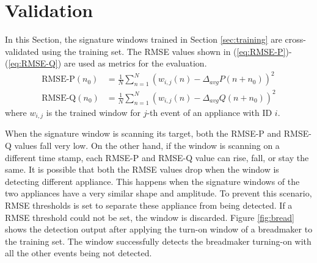\documentclass[conference]{IEEEtran}
\begin{document}
%



 
\section{Validation}\label{sec:cv}
In this Section, the signature windows trained in Section \ref{sec:training} are cross-validated using the training set.  The RMSE values shown in (\ref{eq:RMSE-P})-(\ref{eq:RMSE-Q}) are used as metrics for the evaluation.  
\begin{align}
\label{eq:RMSE-P}
\text{RMSE-P}(n_0) &= \frac{1}{N}\sum\limits_{n=1}^{N}(w_{i,j}(n) - \Delta_{avg}P(n+n_0))^2\\
\label{eq:RMSE-Q}
\text{RMSE-Q}(n_0) &= \frac{1}{N}\sum\limits_{n=1}^{N}(w_{i,j}(n) - \Delta_{avg}Q(n+n_0))^2
\end{align}
where $w_{i,j}$ is the trained window for $j$-th event of an appliance with ID $i$.

When the signature window is scanning its target, both the RMSE-P and RMSE-Q values fall very low.  On the other hand, if the window is scanning on a different time stamp, each RMSE-P and RMSE-Q value can rise, fall, or stay the same.  It is possible that both the RMSE values drop when the window is detecting different appliance.  This happens when the signature windows of the two appliances have a very similar shape and amplitude.  To prevent this scenario, RMSE thresholds is set to separate these appliance from being detected.  If a RMSE threshold could not be set, the window is discarded.  Figure \ref{fig:bread} shows the detection output after applying the turn-on window of a breadmaker to the training set.  The window successfully detects the breadmaker turning-on with all the other events being not detected. 
\end{document}
